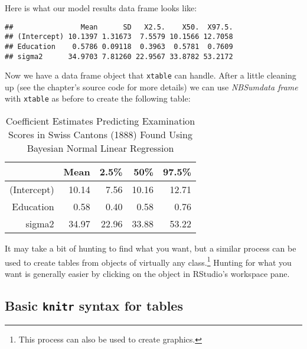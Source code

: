 \noindent Here is what our model results data frame looks like:

\begin{knitrout}
\color{fgcolor}\begin{kframe}
\begin{verbatim}
##                Mean      SD   X2.5.    X50.  X97.5.
## (Intercept) 10.1397 1.31673  7.5579 10.1566 12.7058
## Education    0.5786 0.09118  0.3963  0.5781  0.7609
## sigma2      34.9703 7.81260 22.9567 33.8782 53.2172
\end{verbatim}
\end{kframe}
\end{knitrout}


\noindent Now we have a data frame object that {\tt{xtable}} can handle. After a little cleaning up (see the chapter's source code for more details) we can use {\emph{NBSumdata frame}} with {\tt{xtable}} as before to create the following table:
\vspace{0.5cm}


\begin{table}[ht]
\begin{center}
\begin{tabular}{rrrrr}
  \hline
 & Mean & 2.5\% & 50\% & 97.5\% \\ 
  \hline
(Intercept) & 10.14 & 7.56 & 10.16 & 12.71 \\ 
  Education & 0.58 & 0.40 & 0.58 & 0.76 \\ 
  sigma2 & 34.97 & 22.96 & 33.88 & 53.22 \\ 
   \hline
\end{tabular}
\caption{Coefficient Estimates Predicting Examination Scores in Swiss Cantons (1888) Found Using Bayesian Normal Linear Regression}
\end{center}
\end{table}




It may take a bit of hunting to find what you want, but a similar process can be used to create tables from objects of virtually any class.\footnote{This process can also be used to create graphics.} Hunting for what you want is generally easier by clicking on the object in RStudio's workspace pane.

\subsection{Basic \texttt{knitr} syntax for tables}

